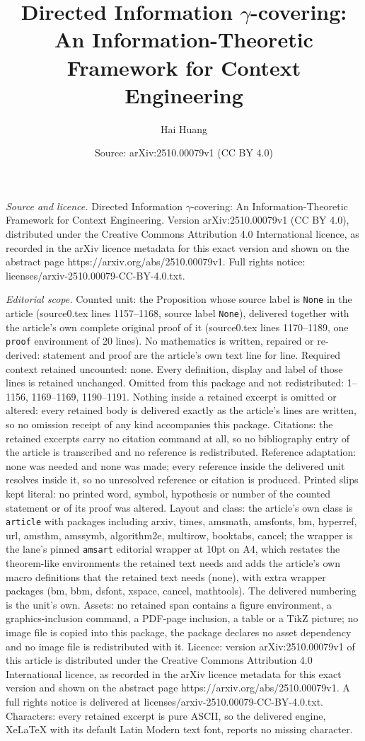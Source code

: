 \documentclass[10pt,a4paper]{amsart}
\title[Directed Information $\gamma$-covering: An Information-Theor]{Directed Information $\gamma$-covering: An Information-Theoretic Framework for Context Engineering}
\author{Hai Huang}
\date{Source: arXiv:2510.00079v1 (CC BY 4.0)}
\begin{document}
\maketitle

\noindent\emph{Source and licence.} Directed Information $\gamma$-covering: An Information-Theoretic Framework for Context Engineering. Version arXiv:2510.00079v1 (CC BY 4.0), distributed under the Creative Commons Attribution 4.0 International licence, as recorded in the arXiv licence metadata for this exact version and shown on the abstract page https://arxiv.org/abs/2510.00079v1. Full rights notice: licenses/arxiv-2510.00079-CC-BY-4.0.txt.\par\smallskip

\noindent\textit{Editorial scope.} Counted unit: the Proposition whose source label is \texttt{None} in the article (source0.tex lines 1157--1168, source label \texttt{None}), delivered together with the article's own complete original proof of it (source0.tex lines 1170--1189, one \texttt{proof} environment of 20 lines). No mathematics is written, repaired or re-derived: statement and proof are the article's own text line for line. Required context retained uncounted: none. Every definition, display and label of those lines is retained unchanged. Omitted from this package and not redistributed: 1--1156, 1169--1169, 1190--1191. Nothing inside a retained excerpt is omitted or altered: every retained body is delivered exactly as the article's lines are written, so no omission receipt of any kind accompanies this package. Citations: the retained excerpts carry no citation command at all, so no bibliography entry of the article is transcribed and no reference is redistributed. Reference adaptation: none was needed and none was made; every reference inside the delivered unit resolves inside it, so no unresolved reference or citation is produced. Printed slips kept literal: no printed word, symbol, hypothesis or number of the counted statement or of its proof was altered. Layout and class: the article's own class is \texttt{article} with packages including arxiv, times, amsmath, amsfonts, bm, hyperref, url, amsthm, amssymb, algorithm2e, multirow, booktabs, cancel; the wrapper is the lane's pinned \texttt{amsart} editorial wrapper at 10pt on A4, which restates the theorem-like environments the retained text needs and adds the article's own macro definitions that the retained text needs (none), with extra wrapper packages (bm, bbm, dsfont, xspace, cancel, mathtools). The delivered numbering is the unit's own. Assets: no retained span contains a figure environment, a graphics-inclusion command, a PDF-page inclusion, a table or a TikZ picture; no image file is copied into this package, the package declares no asset dependency and no image file is redistributed with it. Licence: version arXiv:2510.00079v1 of this article is distributed under the Creative Commons Attribution 4.0 International licence, as recorded in the arXiv licence metadata for this exact version and shown on the abstract page https://arxiv.org/abs/2510.00079v1. A full rights notice is delivered at licenses/arxiv-2510.00079-CC-BY-4.0.txt. Characters: every retained excerpt is pure ASCII, so the delivered engine, XeLaTeX with its default Latin Modern text font, reports no missing character.
\end{document}
